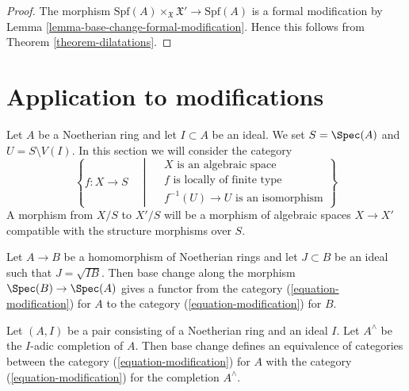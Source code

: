 \begin{proof}
The morphism $\text{Spf}(A) \times_{\mathfrak X} \mathfrak X'
\to \text{Spf}(A)$ is a formal modification by
Lemma \ref{lemma-base-change-formal-modification}.
Hence this follows from Theorem \ref{theorem-dilatations}.
\end{proof}







\section{Application to modifications}
\label{section-modifications}

\noindent
Let $A$ be a Noetherian ring and let $I \subset A$ be an ideal. We set
$S = \Spec(A)$ and $U = S \setminus V(I)$. In this section
we will consider the category
\begin{equation}
\label{equation-modification}
\left\{
f : X \longrightarrow S
\quad \middle| \quad
\begin{matrix}
X\text{ is an algebraic space}\\
f\text{ is locally of finite type}\\
f^{-1}(U) \to U\text{ is an isomorphism}
\end{matrix}
\right\}
\end{equation}
A morphism from $X/S$ to $X'/S$ will be a morphism of algebraic spaces
$X \to X'$ compatible with the structure morphisms over $S$.

\medskip\noindent
Let $A \to B$ be a homomorphism of Noetherian rings and let $J \subset B$
be an ideal such that $J = \sqrt{I B}$. Then base
change along the morphism $\Spec(B) \to \Spec(A)$ gives a functor
from the category (\ref{equation-modification}) for $A$
to the category (\ref{equation-modification}) for $B$.

\begin{lemma}
\label{lemma-Noetherian-local-ring}
Let $(A, I)$ be a pair consisting of a Noetherian ring and an ideal $I$.
Let $A^\wedge$ be the $I$-adic completion of $A$. Then base change defines
an equivalence of categories between the category (\ref{equation-modification})
for $A$ with the category (\ref{equation-modification}) for the completion
$A^\wedge$.
\end{lemma}

